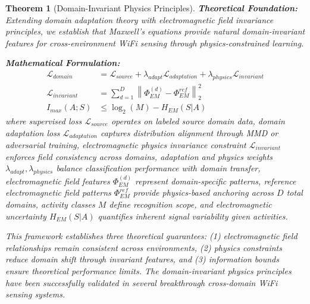 \documentclass[journal]{IEEEtran}
\newtheorem{theorem}{Theorem}
\begin{document}
\begin{theorem}[Domain-Invariant Physics Principles]
\label{thm:domain_invariance}
\textbf{Theoretical Foundation:} Extending domain adaptation theory \cite{ben2010theory} with electromagnetic field invariance principles, we establish that Maxwell's equations provide natural domain-invariant features for cross-environment WiFi sensing through physics-constrained learning.

\textbf{Mathematical Formulation:}
\begin{align}
\mathcal{L}_{domain} &= \mathcal{L}_{source} + \lambda_{adapt} \mathcal{L}_{adaptation} + \lambda_{physics} \mathcal{L}_{invariant} \label{eq:domain_loss} \\
\mathcal{L}_{invariant} &= \sum_{d=1}^D \left\|\Phi_{EM}^{(d)} - \Phi_{EM}^{ref}\right\|_2^2 \label{eq:physics_invariance} \\
I_{max}(A;S) &\leq \log_2(M) - H_{EM}(S|A) \label{eq:information_bound}
\end{align}
where supervised loss $\mathcal{L}_{source}$ operates on labeled source domain data, domain adaptation loss $\mathcal{L}_{adaptation}$ captures distribution alignment through MMD or adversarial training, electromagnetic physics invariance constraint $\mathcal{L}_{invariant}$ enforces field consistency across domains, adaptation and physics weights $\lambda_{adapt}, \lambda_{physics}$ balance classification performance with domain transfer, electromagnetic field features $\Phi_{EM}^{(d)}$ represent domain-specific patterns, reference electromagnetic field patterns $\Phi_{EM}^{ref}$ provide physics-based anchoring across $D$ total domains, activity classes $M$ define recognition scope, and electromagnetic uncertainty $H_{EM}(S|A)$ quantifies inherent signal variability given activities.

This framework establishes three theoretical guarantees: (1) electromagnetic field relationships remain consistent across environments, (2) physics constraints reduce domain shift through invariant features, and (3) information bounds ensure theoretical performance limits. The domain-invariant physics principles have been successfully validated in several breakthrough cross-domain WiFi sensing systems.


\end{theorem}
\end{document}
